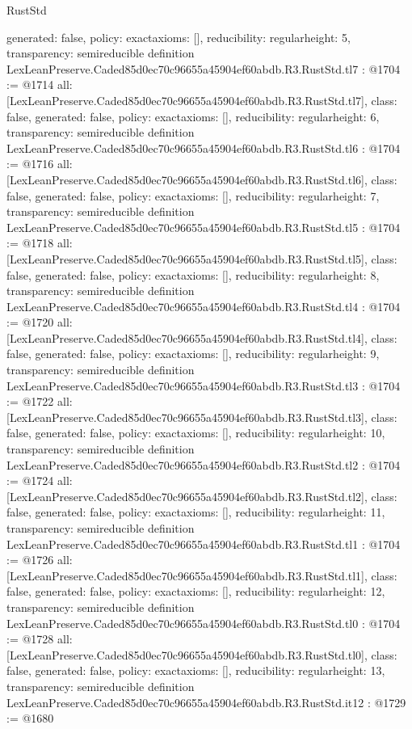 \begin{lexlean}{RustStd}
\begin{coremodule}
{  generated: false,
  policy: exact{axioms: []},
  reducibility: regular{height: 5},
  transparency: semireducible
}
definition LexLeanPreserve.Caded85d0ec70c96655a45904ef60abdb.R3.RustStd.tl7 : @1704 := @1714 {
  all: [LexLeanPreserve.Caded85d0ec70c96655a45904ef60abdb.R3.RustStd.tl7],
  class: false,
  generated: false,
  policy: exact{axioms: []},
  reducibility: regular{height: 6},
  transparency: semireducible
}
definition LexLeanPreserve.Caded85d0ec70c96655a45904ef60abdb.R3.RustStd.tl6 : @1704 := @1716 {
  all: [LexLeanPreserve.Caded85d0ec70c96655a45904ef60abdb.R3.RustStd.tl6],
  class: false,
  generated: false,
  policy: exact{axioms: []},
  reducibility: regular{height: 7},
  transparency: semireducible
}
definition LexLeanPreserve.Caded85d0ec70c96655a45904ef60abdb.R3.RustStd.tl5 : @1704 := @1718 {
  all: [LexLeanPreserve.Caded85d0ec70c96655a45904ef60abdb.R3.RustStd.tl5],
  class: false,
  generated: false,
  policy: exact{axioms: []},
  reducibility: regular{height: 8},
  transparency: semireducible
}
definition LexLeanPreserve.Caded85d0ec70c96655a45904ef60abdb.R3.RustStd.tl4 : @1704 := @1720 {
  all: [LexLeanPreserve.Caded85d0ec70c96655a45904ef60abdb.R3.RustStd.tl4],
  class: false,
  generated: false,
  policy: exact{axioms: []},
  reducibility: regular{height: 9},
  transparency: semireducible
}
definition LexLeanPreserve.Caded85d0ec70c96655a45904ef60abdb.R3.RustStd.tl3 : @1704 := @1722 {
  all: [LexLeanPreserve.Caded85d0ec70c96655a45904ef60abdb.R3.RustStd.tl3],
  class: false,
  generated: false,
  policy: exact{axioms: []},
  reducibility: regular{height: 10},
  transparency: semireducible
}
definition LexLeanPreserve.Caded85d0ec70c96655a45904ef60abdb.R3.RustStd.tl2 : @1704 := @1724 {
  all: [LexLeanPreserve.Caded85d0ec70c96655a45904ef60abdb.R3.RustStd.tl2],
  class: false,
  generated: false,
  policy: exact{axioms: []},
  reducibility: regular{height: 11},
  transparency: semireducible
}
definition LexLeanPreserve.Caded85d0ec70c96655a45904ef60abdb.R3.RustStd.tl1 : @1704 := @1726 {
  all: [LexLeanPreserve.Caded85d0ec70c96655a45904ef60abdb.R3.RustStd.tl1],
  class: false,
  generated: false,
  policy: exact{axioms: []},
  reducibility: regular{height: 12},
  transparency: semireducible
}
definition LexLeanPreserve.Caded85d0ec70c96655a45904ef60abdb.R3.RustStd.tl0 : @1704 := @1728 {
  all: [LexLeanPreserve.Caded85d0ec70c96655a45904ef60abdb.R3.RustStd.tl0],
  class: false,
  generated: false,
  policy: exact{axioms: []},
  reducibility: regular{height: 13},
  transparency: semireducible
}
definition LexLeanPreserve.Caded85d0ec70c96655a45904ef60abdb.R3.RustStd.it12 : @1729 := @1680 {
}
\end{coremodule}
\end{lexlean}
